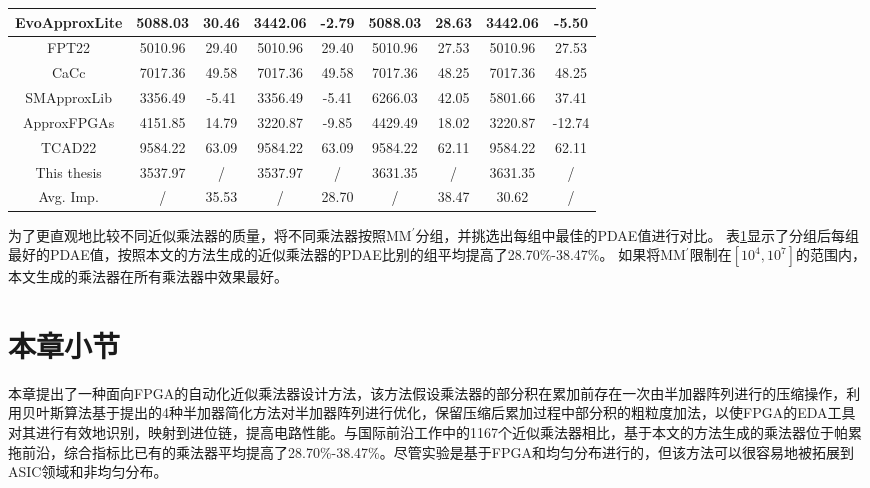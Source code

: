 \begin{table}[!htbp]
\begin{center}
{\begin{tabular}{|c|c|c|c|c|c|c|c|c|}
        \hline
        EvoApproxLite \cite{AC:AM:CGP_EvoLite} & 5088.03 & 30.46 & 3442.06 & -2.79 & 5088.03 & 28.63 & 3442.06 & -5.50 \\
        \hline
        FPT22 \cite{AC:AM:FPGA:FPT22} & 5010.96 & 29.40 & 5010.96 & 29.40 & 5010.96 & 27.53 & 5010.96 & 27.53 \\
        \hline
        CaCc \cite{AC:AM:FPGA:CaCc} & 7017.36 & 49.58 & 7017.36 & 49.58 & 7017.36 & 48.25 & 7017.36 & 48.25 \\
        \hline
        SMApproxLib \cite{AC:AM:FPGA:SMApproxLib} & 3356.49 & -5.41 & 3356.49 & -5.41 & 6266.03 & 42.05 & 5801.66 & 37.41 \\
        \hline
        ApproxFPGAs \cite{AC:AM:FPGA:ApproxFPGAs} & 4151.85 & 14.79 & 3220.87 & -9.85 & 4429.49 & 18.02 & 3220.87 & -12.74 \\
        \hline
        TCAD22 \cite{AC:AM:FPGA:TCAD22} & 9584.22 & 63.09 & 9584.22 & 63.09 & 9584.22 & 62.11 & 9584.22 & 62.11 \\
        \hline
        This thesis & 3537.97 & / & 3537.97 & / & 3631.35 & / & 3631.35 & / \\
        \hline
        Avg. Imp. & / & 35.53 & / & 28.70 & / & 38.47 & 30.62 & / \\
        \hline
        \end{tabular}
    }
        \label{AC:AM:FPGA:AMG:Table:PDAE}
        \end{center}
\end{table}


为了更直观地比较不同近似乘法器的质量，将不同乘法器按照MM$^\prime$分组，并挑选出每组中最佳的PDAE值进行对比。
表\ref{AC:AM:FPGA:AMG:Table:PDAE}显示了分组后每组最好的PDAE值，按照本文的方法生成的近似乘法器的PDAE比别的组平均提高了28.70\%-38.47\%。
如果将MM$^\prime$限制在$[10^4,10^7]$的范围内，本文生成的乘法器在所有乘法器中效果最好。


\section{本章小节}

本章提出了一种面向FPGA的自动化近似乘法器设计方法，该方法假设乘法器的部分积在累加前存在一次由半加器阵列进行的压缩操作，利用贝叶斯算法基于提出的4种半加器简化方法对半加器阵列进行优化，保留压缩后累加过程中部分积的粗粒度加法，以使FPGA的EDA工具对其进行有效地识别，映射到进位链，提高电路性能。与国际前沿工作中的1167个近似乘法器相比，基于本文的方法生成的乘法器位于帕累拖前沿，综合指标比已有的乘法器平均提高了28.70\%-38.47\%。尽管实验是基于FPGA和均匀分布进行的，但该方法可以很容易地被拓展到ASIC领域和非均匀分布。
